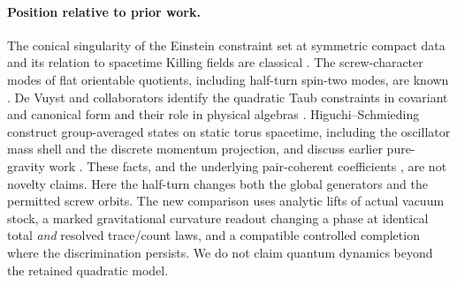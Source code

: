\documentclass[11pt]{article}
\theoremstyle{remark}
\begin{document}
\paragraph{Position relative to prior work.}
The conical singularity of the Einstein constraint set at symmetric compact data and its relation to spacetime Killing fields are classical \cite{AMM,FMM,Moncrief}. The screw-character modes of flat orientable quotients, including half-turn spin-two modes, are known \cite{PLZ,COMPACT}. De Vuyst and collaborators identify the quadratic Taub constraints in covariant and canonical form and their role in physical algebras \cite[Secs.~2.4--2.5, 4]{DV}. Higuchi--Schmieding construct group-averaged states on static torus spacetime, including the oscillator mass shell and the discrete momentum projection, and discuss earlier pure-gravity work \cite[Secs.~2--4]{HS}. These facts, and the underlying pair-coherent coefficients \cite{AB}, are not novelty claims. Here the half-turn changes both the global generators and the permitted screw orbits. The new comparison uses analytic lifts of actual vacuum stock, a marked gravitational curvature readout changing a phase at identical total \emph{and} resolved trace/count laws, and a compatible controlled completion where the discrimination persists. We do not claim quantum dynamics beyond the retained quadratic model.






\end{document}
